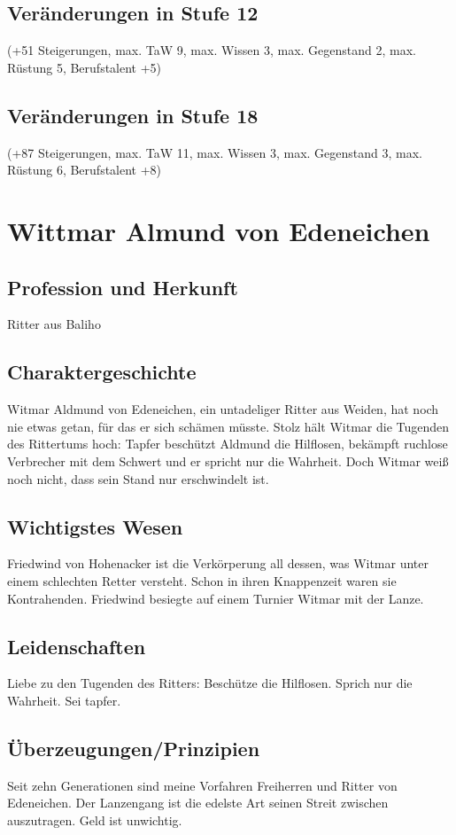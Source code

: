 \subsection{Veränderungen in Stufe 12}
(+51 Steigerungen, max. TaW 9, max. Wissen 3, max. Gegenstand 2, max. Rüstung 5, Berufstalent +5)

\subsection{Veränderungen in Stufe 18}
(+87 Steigerungen, max. TaW 11, max. Wissen 3, max. Gegenstand 3, max. Rüstung 6, Berufstalent +8)



\newpage\section{Wittmar Almund von Edeneichen}\label{RitterBaliho}
\subsection{Profession und Herkunft}
Ritter aus Baliho

\subsection{Charaktergeschichte}
Witmar Aldmund von Edeneichen, ein untadeliger Ritter aus Weiden, hat noch nie etwas getan, für das er sich schämen müsste. Stolz hält Witmar die Tugenden des Rittertums hoch: Tapfer beschützt Aldmund die Hilflosen, bekämpft ruchlose Verbrecher mit dem Schwert und er spricht nur die Wahrheit. Doch Witmar weiß noch nicht, dass sein Stand nur erschwindelt ist.

\subsection{Wichtigstes Wesen}
Friedwind von Hohenacker ist die Verkörperung all dessen, was Witmar unter einem schlechten Retter versteht. Schon in ihren Knappenzeit waren sie Kontrahenden. Friedwind besiegte auf einem Turnier Witmar mit der Lanze.

\subsection{Leidenschaften}
Liebe zu den Tugenden des Ritters: Beschütze die Hilflosen. Sprich nur die Wahrheit. Sei tapfer.

\subsection{Überzeugungen/Prinzipien}
Seit zehn Generationen sind meine Vorfahren Freiherren und Ritter von Edeneichen. Der Lanzengang ist die edelste Art seinen Streit zwischen auszutragen. Geld ist unwichtig.

